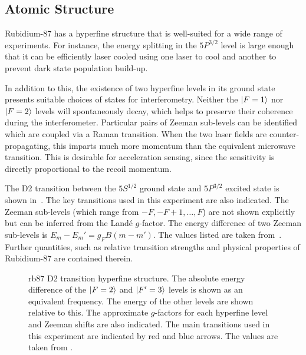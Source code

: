 \subsection{Atomic Structure}\label{subsec:theory_atomic}
Rubidium-87 has a hyperfine structure that is well-suited for a wide
range of experiments. For instance, the energy splitting in the
$5P^{3/2}$ level is large enough that it can be efficiently laser
cooled using one laser to cool and another to prevent dark state
population build-up. 
\par\noindent
In addition to this, the existence of two hyperfine
levels in its ground state presents suitable choices of states for
interferometry. Neither the $\ket{F=1}$ nor $\ket{F=2}$ levels will
spontaneously decay, which helps to preserve their coherence during
the interferometer. Particular pairs of Zeeman sub-levels can be
identified which are coupled via a Raman transition. When the two
laser fields are counter-propagating, this imparts much more momentum
than the equivalent microwave transition. This is desirable for
acceleration sensing, since the sensitivity is directly proportional to
the recoil momentum. 
\par\noindent
The D2 transition between the $5S^{1/2}$ ground state and $5P^{3/2}$
excited state is
shown in~. The key transitions used in
this experiment are also indicated. The Zeeman sub-levels (which range
from $-F,-F+1,\ldots,F$) are not
shown explicitly but can be inferred from the Land\'e $g$-factor.
The energy difference of two Zeeman sub-levels is
$E_m - E_m' = g_F B (m - m')$. The values listed are taken
from~\cite{Steck2001}. Further quantities, such as relative transition
strengths and physical properties of Rubidium-87 are contained
therein. 
\begin{figure}[htpb]
  \centering
  \resizebox{0.8\textwidth}{!}{}
  \caption[Rubidium-87 D2 transition hyperfine structure.]{\ac{rb87} D2 transition hyperfine structure. The absolute
    energy difference of the $\ket{F=2}$ and $\ket{F'=3}$ levels is shown
    as an equivalent frequency. The energy of the other levels are
    shown relative to this. The
  approximate $g$-factors for each hyperfine level and Zeeman
shifts are also indicated. The main transitions used in this
experiment are indicated by red and blue arrows. The values are taken
from \cite{Steck2001}.} 
  \label{fig:rb87_hyperfine}
\end{figure}
